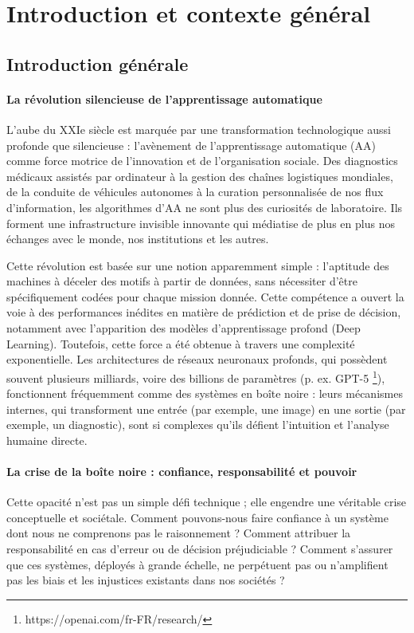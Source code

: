 \part{Introduction et contexte général}
\chapter{Introduction générale}
\label{chap:introduction}

\subsection{La révolution silencieuse de l'apprentissage automatique}
L'aube du XXIe siècle est marquée par une transformation technologique aussi profonde que silencieuse : l'avènement de l'apprentissage automatique (AA) comme force motrice de l'innovation et de l'organisation sociale. Des diagnostics médicaux assistés par ordinateur à la gestion des chaînes logistiques mondiales, de la conduite de véhicules autonomes à la curation personnalisée de nos flux d'information, les algorithmes d'AA ne sont plus des curiosités de laboratoire. Ils forment une infrastructure invisible innovante qui médiatise de plus en plus nos échanges avec le monde, nos institutions et les autres.

Cette révolution est basée sur une notion apparemment simple : l'aptitude des machines à déceler des motifs à partir de données, sans nécessiter d'être spécifiquement codées pour chaque mission donnée. Cette compétence a ouvert la voie à des performances inédites en matière de prédiction et de prise de décision, notamment avec l'apparition des modèles d'apprentissage profond (Deep Learning). Toutefois, cette force a été obtenue à travers une complexité exponentielle. Les architectures de réseaux neuronaux profonds, qui possèdent souvent plusieurs milliards, voire des billions de paramètres (p. ex. GPT-5 \footnote{https://openai.com/fr-FR/research/}), fonctionnent fréquemment comme des systèmes en boîte noire : leurs mécanismes internes, qui transforment une entrée (par exemple, une image) en une sortie (par exemple, un diagnostic), sont si complexes qu'ils défient l'intuition et l'analyse humaine directe.

\subsection{La crise de la boîte noire : confiance, responsabilité et pouvoir}
Cette opacité n'est pas un simple défi technique ; elle engendre une véritable crise conceptuelle et sociétale. Comment pouvons-nous faire confiance à un système dont nous ne comprenons pas le raisonnement ? Comment attribuer la responsabilité en cas d'erreur ou de décision préjudiciable ? Comment s'assurer que ces systèmes, déployés à grande échelle, ne perpétuent pas ou n'amplifient pas les biais et les injustices existants dans nos sociétés ?

